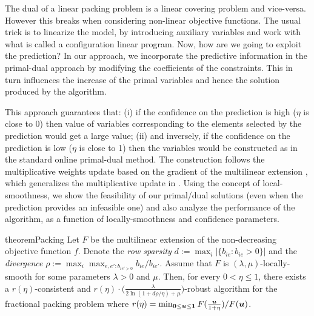 The dual of a linear packing problem is a linear covering problem and vice-versa.  However this breaks when considering non-linear objective functions.  The usual trick is to linearize the model, by introducing auxiliary variables and work with what is called a configuration linear program. Now, how are we going to exploit the prediction? 
In our approach, we incorporate the predictive information in the primal-dual approach by modifying the coefficients of the constraints.  This in turn influences the increase of the primal variables and hence the solution produced by the algorithm.

This approach guarantees that:  
(i) if the confidence on the prediction is high ($\eta$ is close to 0) then value of variables corresponding to the elements selected by the prediction would get a large value; (ii) and inversely, if the confidence on the prediction is low ($\eta$ is close to 1) then
the variables would be constructed as in the standard online primal-dual method. 
The construction follows the multiplicative weights update based on the gradient of the multilinear extension \cite{Thang20:Online-Primal-Dual},
which generalizes the multiplicative update in \cite{BuchbinderNaor09:The-Design-of-Competitive,AzarBuchbinder16:Online-Algorithms}.  
Using the concept of local-smoothness, we show the feasibility of our primal/dual solutions (even when the prediction provides an infeasible one)  and also analyze the performance of the algorithm, as a function of locally-smoothness and confidence parameters.


\begin{restatable}{theorem}{Packing}
\label{thm:packing}
Let $F$ be the multilinear extension of the non-decreasing objective function $f$. Denote the \emph{row sparsity}
$d := \max_{i} |\{b_{ie}: b_{ie} > 0\}|$ and the \emph{divergence}
$\rho := \max_{i} \max_{e,e': b_{ie' > 0}} b_{ie} / b_{ie'}$.  
Assume that $F$ is $(\lambda, \mu)$-locally-smooth 
for some parameters $\lambda > 0$ and $\mu$. 
Then, for every $0 < \eta \leq 1$, 
there exists a $r(\eta)$-consistent and $r(\eta) \cdot \bigl( \frac{\lambda}{2\ln(1+ d\rho/\eta) + \mu} \bigr)$-robust algorithm
for the fractional packing problem where $r(\eta) = \min_{\bm{0} \leq \bm{u} \leq \bm{1}} F(\frac{\bm{u}}{1 + \eta} )/F(\bm{u})$.
\end{restatable}


